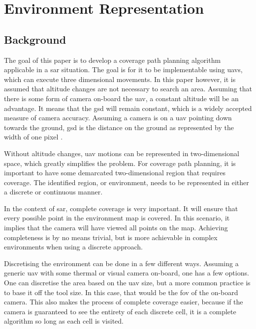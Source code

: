 \chapter{Environment Representation}
\label{chp:Envir-Rep}


\section{Background}

The goal of this paper is to develop a coverage path planning algorithm \hbox{applicable} in a \acl{sar} situation. The goal is for it to be implementable using \acsp{uav}, which can execute three dimensional movements. In this paper however, it is assumed that altitude changes are not necessary to search an area. Assuming that there is some form of camera on-board the \acs{uav}, a constant altitude will be an advantage. It means that the \acf{gsd} will remain constant, which is a widely accepted measure of camera accuracy. Assuming a camera is on a \acs{uav} pointing down towards the ground, \acs{gsd} is the distance on the ground as represented by the width of one pixel \cite{PropellerAero2021}.

Without altitude changes, \acs{uav} motions can be represented in two-dimensional space, which greatly simplifies the problem. For coverage path planning, it is important to have some demarcated two-dimensional region that requires coverage. The identified region, or environment, needs to be represented in either a discrete or continuous manner. 

In the context of \acs{sar}, complete coverage is very important. It will ensure that every possible point in the environment map is covered. In this scenario, it implies that the camera will have viewed all points on the map. Achieving completeness is by no means trivial, but is more achievable in complex environments when using a discrete approach. 

Discretising the environment can be done in a few different ways. Assuming a generic \acs{uav} with some thermal or visual camera on-board, one has a few options. One can discretise the area based on the \acs{uav} size, but a more common practice is to base it off the tool size. In this case, that would be the \acf{fov} of the on-board camera. This also makes the process of complete coverage easier, because if the camera is guaranteed to see the entirety of each discrete cell, it is a complete algorithm so long as each cell is visited.


